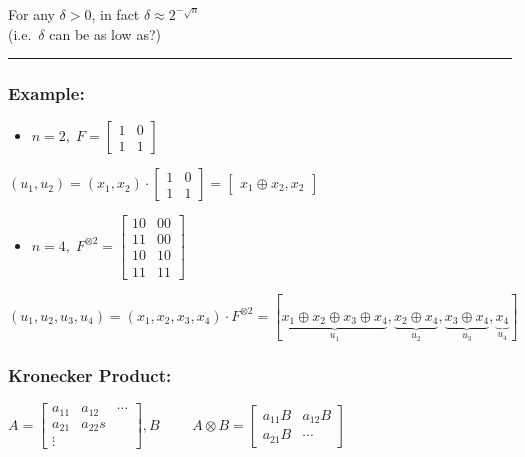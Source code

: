 \documentclass[11pt]{article}
\providecommand{\tightlist}{%
      \setlength{\itemsep}{0pt}\setlength{\parskip}{0pt}}
\begin{document}
    For any \(\delta > 0\), in fact \(\delta \approx 2^{-\sqrt{n}}\)\\
(i.e.~\(\delta\) can be as low as?)

\begin{center}\rule{0.5\linewidth}{0.5pt}\end{center}

\subsubsection{Example:}\label{example}

\begin{itemize}
\tightlist
\item
  \(n= 2, \; F = \begin{bmatrix} 1 & 0 \\ 1 & 1 \end{bmatrix}\)
\end{itemize}

\((u_1, u_2) = (x_1, x_2) \cdot  \begin{bmatrix} 1 & 0 \\ 1 & 1 \end{bmatrix} = \begin{bmatrix} x_1 \oplus x_2, x_2 \end{bmatrix}\)

\begin{itemize}
\tightlist
\item
  \(n = 4, \; F^{\otimes 2} = \begin{bmatrix} 10 & 00 \\ 11 & 00 \\ 10 & 10 \\ 11 & 11 \end{bmatrix}\)
\end{itemize}

\((u_1, u_2, u_3, u_4) = (x_1, x_2, x_3, x_4) \cdot F^{\otimes 2} = [ \underbrace{x_1 \oplus x_2 \oplus x_3 \oplus x_4}_{u_1} , \underbrace{x_2 \oplus x_4}_{u_2}  , \underbrace{x_3 \oplus x_4}_{u_3}  , \underbrace{x_4}_{u_4}  ]\)

\subsubsection{Kronecker Product:}\label{kronecker-product}

\(A = \begin{bmatrix} a_{11} & a_{12}  & \cdots \\ a_{21} & a_{22}s \\ \vdots \end{bmatrix}, B \qquad\)
\(A \otimes B = \begin{bmatrix} a_{11}B & a_{12}B \\ a_{21}B & \cdots \end{bmatrix}\)
\end{document}
